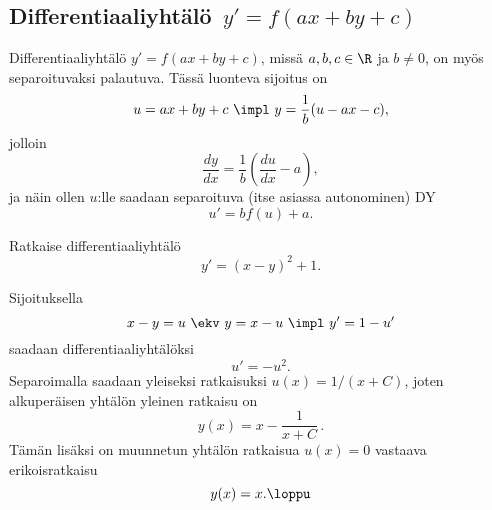\subsection{Differentiaaliyhtälö $\,y'=f(ax+by+c)$}

Differentiaaliyhtälö $y'=f(ax+by+c)$, missä $a,b,c\in\R$ ja $b \neq 0$, on myös separoituvaksi
palautuva. Tässä luonteva sijoitus on
\[
u=ax+by+c \ \impl \ y=\frac{1}{b}(u-ax-c),
\]
jolloin
\[
\frac{dy}{dx}=\frac{1}{b}\left(\frac{du}{dx}-a\right),
\]
ja näin ollen $u$:lle saadaan separoituva (itse asiassa autonominen) DY
\[
u'=bf(u)+a.
\]
\begin{Exa}
Ratkaise differentiaaliyhtälö
\[
y'=(x-y)^2+1.
\]
\end{Exa}
\ratk Sijoituksella
\[
x-y=u \ \ekv \ y=x-u \ \impl \ y'=1-u'
\]
saadaan differentiaaliyhtälöksi
\[
u'=-u^2.
\]
Separoimalla saadaan yleiseksi ratkaisuksi $u(x)=1/(x+C)$, joten alkuperäisen yhtälön yleinen
ratkaisu on
\[
y(x)=x-\frac{1}{x+C}\,.
\]
Tämän lisäksi on muunnetun yhtälön ratkaisua $u(x)=0$ vastaava erikoisratkaisu
\[
y(x)=x. \loppu
\]


